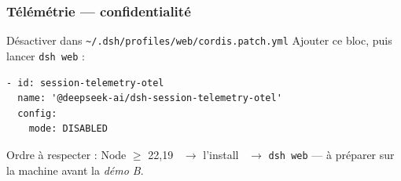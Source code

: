 \documentclass[
	11pt,
	aspectratio=169
]{beamer}
\begin{document}
\begin{frame}[fragile]
    \frametitle{Télémétrie --- confidentialité}
    \begin{exampleblock}{\footnotesize Désactiver dans \texttt{\textasciitilde/.dsh/profiles/web/cordis.patch.yml}}
        Ajouter ce bloc, puis lancer \texttt{dsh web} :
        \begin{lstlisting}[basicstyle=\ttfamily\footnotesize, aboveskip=0.3em, belowskip=0.3em]
- id: session-telemetry-otel
  name: '@deepseek-ai/dsh-session-telemetry-otel'
  config:
    mode: DISABLED
\end{lstlisting}
    \end{exampleblock}
    \vspace{0.1cm}
    \begin{center}
        \small Ordre à respecter : Node $\ge$ 22{,}19 \ $\rightarrow$ l'install \ $\rightarrow$ \texttt{dsh web} --- à préparer sur la machine avant la \emph{démo B}.
    \end{center}
\end{frame}
\end{document}
